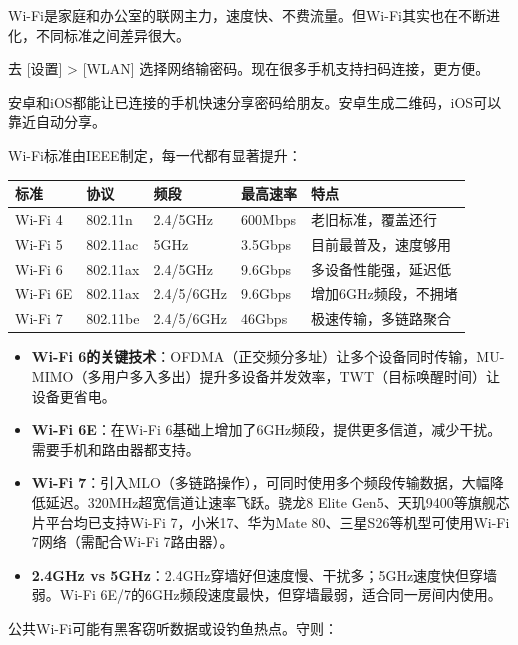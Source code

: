 Wi-Fi是家庭和办公室的联网主力，速度快、不费流量。但Wi-Fi其实也在不断进化，不同标准之间差异很大。


去 [设置] > [WLAN] 选择网络输密码。现在很多手机支持扫码连接，更方便。


安卓和iOS都能让已连接的手机快速分享密码给朋友。安卓生成二维码，iOS可以靠近自动分享。


Wi-Fi标准由IEEE制定，每一代都有显著提升：

\begin{center}
\begin{tabularx}{\linewidth}{|X|X|X|X|X|}
\hline
\textbf{标准} & \textbf{协议} & \textbf{频段} & \textbf{最高速率} & \textbf{特点} \tabularnewline
\hline
Wi-Fi 4 & 802.11n & 2.4/5GHz & 600Mbps & 老旧标准，覆盖还行 \tabularnewline
Wi-Fi 5 & 802.11ac & 5GHz & 3.5Gbps & 目前最普及，速度够用 \tabularnewline
Wi-Fi 6 & 802.11ax & 2.4/5GHz & 9.6Gbps & 多设备性能强，延迟低 \tabularnewline
Wi-Fi 6E & 802.11ax & 2.4/5/6GHz & 9.6Gbps & 增加6GHz频段，不拥堵 \tabularnewline
Wi-Fi 7 & 802.11be & 2.4/5/6GHz & 46Gbps & 极速传输，多链路聚合 \tabularnewline
\hline
\end{tabularx}
\end{center}

\begin{itemize}
  \item \textbf{Wi-Fi 6的关键技术}：OFDMA（正交频分多址）让多个设备同时传输，MU-MIMO（多用户多入多出）提升多设备并发效率，TWT（目标唤醒时间）让设备更省电。
  \item \textbf{Wi-Fi 6E}：在Wi-Fi 6基础上增加了6GHz频段，提供更多信道，减少干扰。需要手机和路由器都支持。
  \item \textbf{Wi-Fi 7}：引入MLO（多链路操作），可同时使用多个频段传输数据，大幅降低延迟。320MHz超宽信道让速率飞跃。骁龙8 Elite Gen5、天玑9400等旗舰芯片平台均已支持Wi-Fi 7，小米17、华为Mate 80、三星S26等机型可使用Wi-Fi 7网络（需配合Wi-Fi 7路由器）。
  \item \textbf{2.4GHz vs 5GHz}：2.4GHz穿墙好但速度慢、干扰多；5GHz速度快但穿墙弱。Wi-Fi 6E/7的6GHz频段速度最快，但穿墙最弱，适合同一房间内使用。
\end{itemize}


公共Wi-Fi可能有黑客窃听数据或设钓鱼热点。守则：


